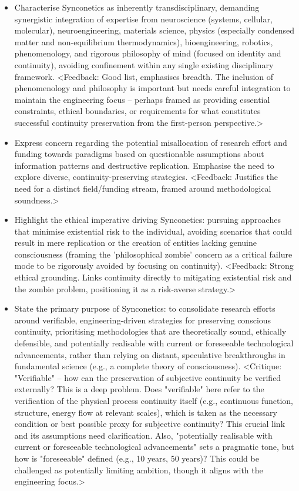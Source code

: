 \documentclass[10pt]{article}
\begin{document}
\begin{sloppypar}
\begin{itemize}
    \item Characterise Synconetics as inherently transdisciplinary, demanding synergistic integration of expertise from neuroscience (systems, cellular, molecular), neuroengineering, materials science, physics (especially condensed matter and non-equilibrium thermodynamics), bioengineering, robotics, phenomenology, and rigorous philosophy of mind (focused on identity and continuity), avoiding confinement within any single existing disciplinary framework. <Feedback: Good list, emphasises breadth. The inclusion of phenomenology and philosophy is important but needs careful integration to maintain the engineering focus – perhaps framed as providing essential constraints, ethical boundaries, or requirements for what constitutes successful continuity preservation from the first-person perspective.>

    \item Express concern regarding the potential misallocation of research effort and funding towards paradigms based on questionable assumptions about information patterns and destructive replication. Emphasise the need to explore diverse, continuity-preserving strategies. <Feedback: Justifies the need for a distinct field/funding stream, framed around methodological soundness.>

    \item Highlight the ethical imperative driving Synconetics: pursuing approaches that minimise existential risk to the individual, avoiding scenarios that could result in mere replication or the creation of entities lacking genuine consciousness (framing the 'philosophical zombie' concern as a critical failure mode to be rigorously avoided by focusing on continuity). <Feedback: Strong ethical grounding. Links continuity directly to mitigating existential risk and the zombie problem, positioning it as a risk-averse strategy.>

    \item State the primary purpose of Synconetics: to consolidate research efforts around verifiable, engineering-driven strategies for preserving conscious continuity, prioritising methodologies that are theoretically sound, ethically defensible, and potentially realisable with current or foreseeable technological advancements, rather than relying on distant, speculative breakthroughs in fundamental science (e.g., a complete theory of consciousness). <Critique: "Verifiable" – how can the preservation of subjective continuity be verified externally? This is a deep problem. Does "verifiable" here refer to the verification of the physical process continuity itself (e.g., continuous function, structure, energy flow at relevant scales), which is taken as the necessary condition or best possible proxy for subjective continuity? This crucial link and its assumptions need clarification. Also, "potentially realisable with current or foreseeable technological advancements" sets a pragmatic tone, but how is "foreseeable" defined (e.g., 10 years, 50 years)? This could be challenged as potentially limiting ambition, though it aligns with the engineering focus.>


\end{itemize}
\end{sloppypar}
\end{document}
